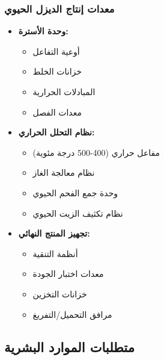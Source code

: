 \subsubsection{معدات إنتاج الديزل الحيوي}
\begin{itemize}
    \item \textbf{وحدة الأسترة:}
    \begin{itemize}
        \item أوعية التفاعل
        \item خزانات الخلط
        \item المبادلات الحرارية
        \item معدات الفصل
    \end{itemize}
    
    \item \textbf{نظام التحلل الحراري:}
    \begin{itemize}
        \item مفاعل حراري (400-500 درجة مئوية)
        \item نظام معالجة الغاز
        \item وحدة جمع الفحم الحيوي
        \item نظام تكثيف الزيت الحيوي
    \end{itemize}
    
    \item \textbf{تجهيز المنتج النهائي:}
    \begin{itemize}
        \item أنظمة التنقية
        \item معدات اختبار الجودة
        \item خزانات التخزين
        \item مرافق التحميل/التفريغ
    \end{itemize}
\end{itemize}

\subsection{متطلبات الموارد البشرية}

